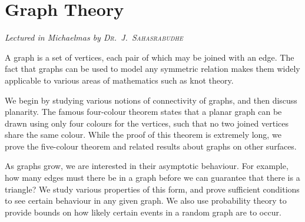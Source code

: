 \chapter[Graph Theory \\ \textnormal{\emph{Lectured in Michaelmas \oldstylenums{2022} by \textsc{Dr.\ J.\ Sahasrabudhe}}}]{Graph Theory}
\emph{\Large Lectured in Michaelmas  by \textsc{Dr.\ J.\ Sahasrabudhe}}

A graph is a set of vertices, each pair of which may be joined with an edge.
The fact that graphs can be used to model any symmetric relation makes them widely applicable to various areas of mathematics such as knot theory.

We begin by studying various notions of connectivity of graphs, and then discuss planarity.
The famous four-colour theorem states that a planar graph can be drawn using only four colours for the vertices, such that no two joined vertices share the same colour.
While the proof of this theorem is extremely long, we prove the five-colour theorem and related results about graphs on other surfaces.

As graphs grow, we are interested in their asymptotic behaviour.
For example, how many edges must there be in a graph before we can guarantee that there is a triangle?
We study various properties of this form, and prove sufficient conditions to see certain behaviour in any given graph.
We also use probability theory to provide bounds on how likely certain events in a random graph are to occur.


